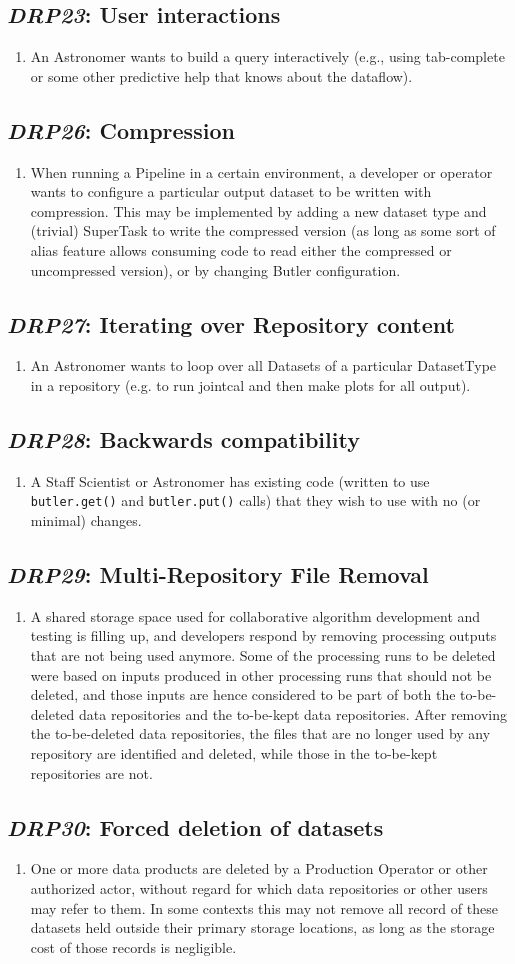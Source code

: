 \documentclass[DM,toc,lsstdraft]{lsstdoc}
\newcommand{\usecase}[3]{%
\subsection{\emph{#1}: #2}
\label{use:#1}
\begin{enumerate}[label=\alph*.]
#3
\end{enumerate}
}
\begin{document}
\usecase{DRP23}{User interactions}{%

\item
An Astronomer wants to build a query interactively (e.g., using tab-complete or some other predictive help that knows about the dataflow).
}

\usecase{DRP26}{Compression}{%

\item
When running a Pipeline in a certain environment, a developer or operator wants to configure a particular output dataset to be written with compression.
This may be implemented by adding a new dataset type and (trivial) SuperTask to write the compressed version (as long as some sort of alias feature allows consuming code to read either the compressed or uncompressed version), or by changing Butler configuration.
}

\usecase{DRP27}{Iterating over Repository content}{%

\item
An Astronomer wants to loop over all Datasets of a particular DatasetType in a repository (e.g. to run jointcal and then make plots for all output).
}

\usecase{DRP28}{Backwards compatibility}{%

\item
A Staff Scientist or Astronomer has existing code (written to use \texttt{butler.get()} and \texttt{butler.put()} calls) that they wish to use with no (or minimal) changes.
}

\usecase{DRP29}{Multi-Repository File Removal}{%

\item
A shared storage space used for collaborative algorithm development and testing is filling up, and developers respond by removing processing outputs that are not being used anymore.
Some of the processing runs to be deleted were based on inputs produced in other processing runs that should not be deleted, and those inputs are hence considered to be part of both the to-be-deleted data repositories and the to-be-kept data repositories.
After removing the to-be-deleted data repositories, the files that are no longer used by any repository are identified and deleted, while those in the to-be-kept repositories are not.
}

\usecase{DRP30}{Forced deletion of datasets}{%

\item
One or more data products are deleted by a Production Operator or other authorized actor, without regard for which data repositories or other users may refer to them.
In some contexts this may not remove all record of these datasets held outside their primary storage locations, as long as the storage cost of those records is negligible.
}
\end{document}
